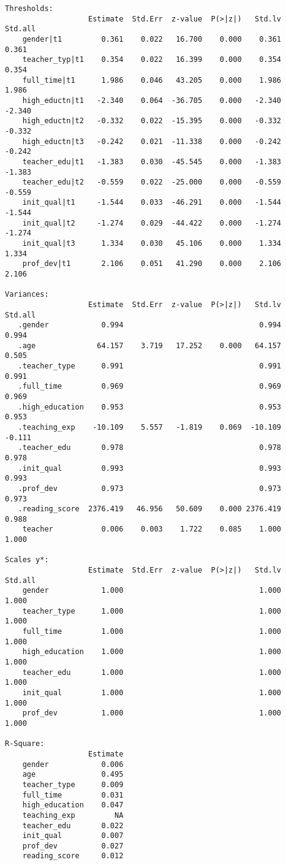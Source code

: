 \documentclass[
]{article}
\begin{document}
\begin{verbatim}
Thresholds:
                   Estimate  Std.Err  z-value  P(>|z|)   Std.lv  Std.all
    gender|t1         0.361    0.022   16.700    0.000    0.361    0.361
    teacher_typ|t1    0.354    0.022   16.399    0.000    0.354    0.354
    full_time|t1      1.986    0.046   43.205    0.000    1.986    1.986
    high_eductn|t1   -2.340    0.064  -36.705    0.000   -2.340   -2.340
    high_eductn|t2   -0.332    0.022  -15.395    0.000   -0.332   -0.332
    high_eductn|t3   -0.242    0.021  -11.338    0.000   -0.242   -0.242
    teacher_edu|t1   -1.383    0.030  -45.545    0.000   -1.383   -1.383
    teacher_edu|t2   -0.559    0.022  -25.000    0.000   -0.559   -0.559
    init_qual|t1     -1.544    0.033  -46.291    0.000   -1.544   -1.544
    init_qual|t2     -1.274    0.029  -44.422    0.000   -1.274   -1.274
    init_qual|t3      1.334    0.030   45.106    0.000    1.334    1.334
    prof_dev|t1       2.106    0.051   41.290    0.000    2.106    2.106

Variances:
                   Estimate  Std.Err  z-value  P(>|z|)   Std.lv  Std.all
   .gender            0.994                               0.994    0.994
   .age              64.157    3.719   17.252    0.000   64.157    0.505
   .teacher_type      0.991                               0.991    0.991
   .full_time         0.969                               0.969    0.969
   .high_education    0.953                               0.953    0.953
   .teaching_exp    -10.109    5.557   -1.819    0.069  -10.109   -0.111
   .teacher_edu       0.978                               0.978    0.978
   .init_qual         0.993                               0.993    0.993
   .prof_dev          0.973                               0.973    0.973
   .reading_score  2376.419   46.956   50.609    0.000 2376.419    0.988
    teacher           0.006    0.003    1.722    0.085    1.000    1.000

Scales y*:
                   Estimate  Std.Err  z-value  P(>|z|)   Std.lv  Std.all
    gender            1.000                               1.000    1.000
    teacher_type      1.000                               1.000    1.000
    full_time         1.000                               1.000    1.000
    high_education    1.000                               1.000    1.000
    teacher_edu       1.000                               1.000    1.000
    init_qual         1.000                               1.000    1.000
    prof_dev          1.000                               1.000    1.000

R-Square:
                   Estimate
    gender            0.006
    age               0.495
    teacher_type      0.009
    full_time         0.031
    high_education    0.047
    teaching_exp         NA
    teacher_edu       0.022
    init_qual         0.007
    prof_dev          0.027
    reading_score     0.012
\end{verbatim}
\end{document}
